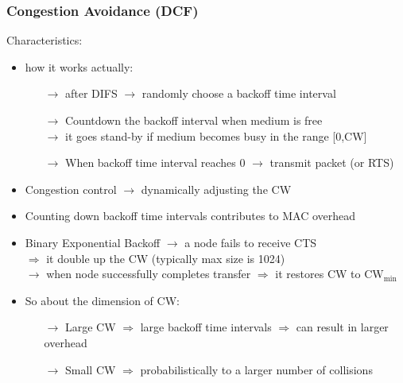 \subsubsection{Congestion Avoidance (DCF)}
Characteristics:
\begin{itemize}
    \item how it works actually:
    \begin{itemize}
        \item[$\rightarrow$] after DIFS $\rightarrow$ randomly choose a backoff time interval
        \item[$\rightarrow$] Countdown the backoff interval when medium is free\\$\rightarrow$ it goes stand-by if medium becomes busy
        in the range [0,CW]
        \item[$\rightarrow$] When backoff time interval reaches 0 $\rightarrow$ transmit packet (or RTS)
    \end{itemize}
    \item Congestion control $\rightarrow$ dynamically adjusting the CW
    \item Counting down backoff time intervals contributes to MAC overhead
    \item Binary Exponential Backoff $\rightarrow$ a node fails to receive CTS\\
    $\Rightarrow$ it double up the CW (typically max size is 1024)\\
    $\rightarrow$ when node successfully completes transfer $\Rightarrow$ it restores CW to $\text{CW}_\text{min}$
    \item So about the dimension of CW:
    \begin{itemize}
        \item[$\rightarrow$] Large CW $\Rightarrow$ large backoff time intervals $\Rightarrow$
        can result in larger overhead
        \item[$\rightarrow$] Small CW $\Rightarrow$ probabilistically to a larger number of collisions
    \end{itemize}
\end{itemize}

